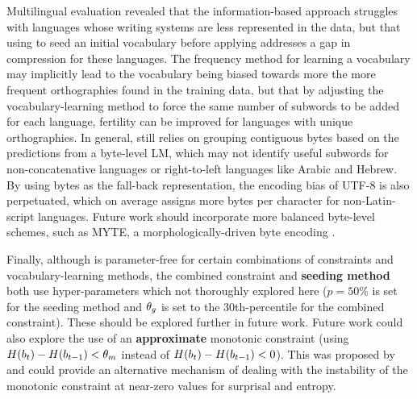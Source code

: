 Multilingual evaluation revealed that the information-based approach struggles with languages whose writing systems are less represented in the data, but that using \tokname to seed an initial vocabulary before applying \bpe addresses a gap in compression for these languages. The frequency method for learning a vocabulary may implicitly lead to the vocabulary being biased towards more the more frequent orthographies found in the training data, but that by adjusting the vocabulary-learning method to force the same number of subwords to be added for each language, fertility can be improved for languages with unique orthographies. In general, \tokname still relies on grouping contiguous bytes based on the predictions from a byte-level LM, which may not identify useful subwords for non-concatenative languages or right-to-left languages like Arabic and Hebrew. By using bytes as the fall-back representation, the encoding bias of UTF-8 is also perpetuated, which on average assigns more bytes per character for non-Latin-script languages. Future work should incorporate more balanced byte-level schemes, such as MYTE, a morphologically-driven byte encoding \citep{limisiewicz-etal-2024-myte}.

Finally, although \tokname is parameter-free for certain combinations of constraints and vocabulary-learning methods, the combined constraint and \textbf{seeding method} both use hyper-parameters which not thoroughly explored here ($p=50\%$ is set for the seeding method and $\theta_g$ is set to the 30th-percentile for the combined constraint). These should be explored further in future work. Future work could also explore the use of an \textbf{approximate} monotonic constraint (using $H(b_t) - H(b_{t-1}) < \theta_m$ instead of $H(b_t) - H(b_{t-1}) < 0$). This was proposed by \citet{pagnoni2024byte} and could provide an alternative mechanism of dealing with the instability of the monotonic constraint at near-zero values for surprisal and entropy.


